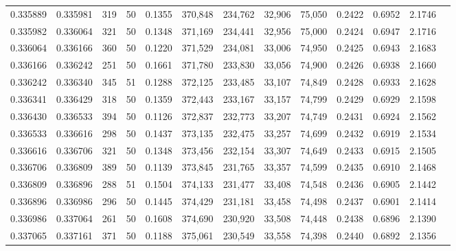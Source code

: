 \begin{tabular}{rrrrrrrrrrrrr}
0.335889 & 0.335981 &   319 &  50 &                                     0.1355 & 370,848 & 234,762 &  32,906 &  75,050 & 0.2422 & 0.6952 & 2.1746 \\
0.335982 & 0.336064 &   321 &  50 &                                     0.1348 & 371,169 & 234,441 &  32,956 &  75,000 & 0.2424 & 0.6947 & 2.1716 \\
0.336064 & 0.336166 &   360 &  50 &                                     0.1220 & 371,529 & 234,081 &  33,006 &  74,950 & 0.2425 & 0.6943 & 2.1683 \\
0.336166 & 0.336242 &   251 &  50 &                                     0.1661 & 371,780 & 233,830 &  33,056 &  74,900 & 0.2426 & 0.6938 & 2.1660 \\
0.336242 & 0.336340 &   345 &  51 &                                     0.1288 & 372,125 & 233,485 &  33,107 &  74,849 & 0.2428 & 0.6933 & 2.1628 \\
0.336341 & 0.336429 &   318 &  50 &                                     0.1359 & 372,443 & 233,167 &  33,157 &  74,799 & 0.2429 & 0.6929 & 2.1598 \\
0.336430 & 0.336533 &   394 &  50 &                                     0.1126 & 372,837 & 232,773 &  33,207 &  74,749 & 0.2431 & 0.6924 & 2.1562 \\
0.336533 & 0.336616 &   298 &  50 &                                     0.1437 & 373,135 & 232,475 &  33,257 &  74,699 & 0.2432 & 0.6919 & 2.1534 \\
0.336616 & 0.336706 &   321 &  50 &                                     0.1348 & 373,456 & 232,154 &  33,307 &  74,649 & 0.2433 & 0.6915 & 2.1505 \\
0.336706 & 0.336809 &   389 &  50 &                                     0.1139 & 373,845 & 231,765 &  33,357 &  74,599 & 0.2435 & 0.6910 & 2.1468 \\
0.336809 & 0.336896 &   288 &  51 &                                     0.1504 & 374,133 & 231,477 &  33,408 &  74,548 & 0.2436 & 0.6905 & 2.1442 \\
0.336896 & 0.336986 &   296 &  50 &                                     0.1445 & 374,429 & 231,181 &  33,458 &  74,498 & 0.2437 & 0.6901 & 2.1414 \\
0.336986 & 0.337064 &   261 &  50 &                                     0.1608 & 374,690 & 230,920 &  33,508 &  74,448 & 0.2438 & 0.6896 & 2.1390 \\
0.337065 & 0.337161 &   371 &  50 &                                     0.1188 & 375,061 & 230,549 &  33,558 &  74,398 & 0.2440 & 0.6892 & 2.1356 \\

\end{tabular}
